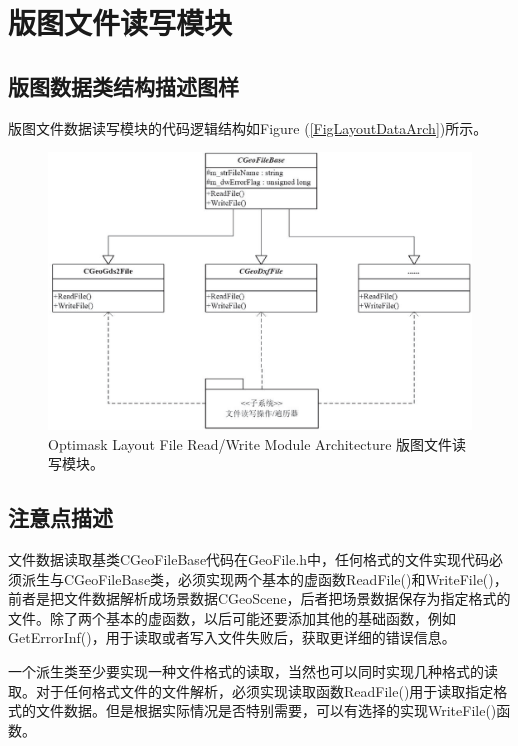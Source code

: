 \section{版图文件读写模块} \label{SectArchFileRW}
\subsection{版图数据类结构描述图样} \label{SectArchFileStrc} 
版图文件数据读写模块的代码逻辑结构如Figure (\ref{FigLayoutDataArch})所示。
\begin{figure}[htb!p] %
	\centering
	\includegraphics[width=6in]{./Layout/FigsArch/LayoutFileRWmodule.eps}
	\caption{Optimask Layout File Read/Write Module Architecture 版图文件读写模块。}
	\label{FigLayoutFileArch}
\end{figure}

\subsection{注意点描述} \label{SectArchFileNote} 
文件数据读取基类CGeoFileBase代码在GeoFile.h中，任何格式的文件实现代码必须派生与CGeoFileBase类，必须实现两个基本的虚函数ReadFile()和WriteFile()，前者是把文件数据解析成场景数据CGeoScene，后者把场景数据保存为指定格式的文件。除了两个基本的虚函数，以后可能还要添加其他的基础函数，例如GetErrorInf()，用于读取或者写入文件失败后，获取更详细的错误信息。

一个派生类至少要实现一种文件格式的读取，当然也可以同时实现几种格式的读取。对于任何格式文件的文件解析，必须实现读取函数ReadFile()用于读取指定格式的文件数据。但是根据实际情况是否特别需要，可以有选择的实现WriteFile()函数。

